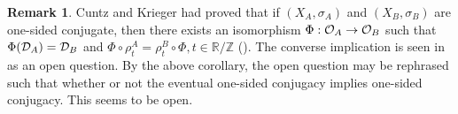 \documentclass[11pt]{article}
\newtheorem{corollary}[theorem]{Corollary}
\theoremstyle{plain}
\theoremstyle{definition}
\newtheorem{remark}[theorem]{Remark}
\numberwithin{equation}{section}
\renewcommand{\labelenumi}{\textup{(\theenumi)}}
\newcommand{\Ad}{\operatorname{Ad}}
\newcommand{\RZ}{\mathbb{R}/{\mathbb{Z}}}
\newcommand{\Z}{\mathbb{Z}}
\begin{document}
\begin{remark}
Cuntz and Krieger had proved that
if 
$(X_A, \sigma_A)$ and $(X_B,\sigma_B)$
are one-sided conjugate,
then there exists an isomorphism
$\Phi:{{\mathcal{O}}_A} \rightarrow {{\mathcal{O}}_B}$ 
such that 
$
\Phi({{\mathcal{D}}_A}) = {{\mathcal{D}}_B}
$
and
$\Phi \circ \rho^A_t = \rho^B_t \circ \Phi, 
t \in {\RZ}
$
(\cite[2.17. Proposition]{CK}).
The converse implication is seen in \cite{Tomforde}
as an open question.
By the above corollary, the open question may be rephrased 
such that whether or not
the eventual one-sided conjugacy implies one-sided conjugacy.
This seems to be open.
\end{remark}
\end{document}
